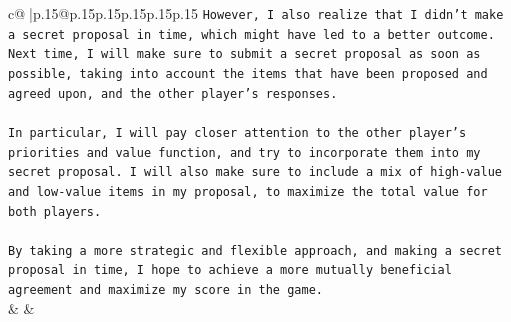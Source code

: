 \documentclass{article}
\begin{document}
{\begin{supertabular}{c@{$\;$}|p{.15\linewidth}@{}p{.15\linewidth}p{.15\linewidth}p{.15\linewidth}p{.15\linewidth}p{.15\linewidth}}
{{{\texttt{However, I also realize that I didn't make a secret proposal in time, which might have led to a better outcome. Next time, I will make sure to submit a secret proposal as soon as possible, taking into account the items that have been proposed and agreed upon, and the other player's responses.} \\
\\ 
\texttt{In particular, I will pay closer attention to the other player's priorities and value function, and try to incorporate them into my secret proposal. I will also make sure to include a mix of high{-}value and low{-}value items in my proposal, to maximize the total value for both players.} \\
\\ 
\texttt{By taking a more strategic and flexible approach, and making a secret proposal in time, I hope to achieve a more mutually beneficial agreement and maximize my score in the game.} \\
            }
        }
    }
    & & \\ \\


\end{supertabular}}
\end{document}
